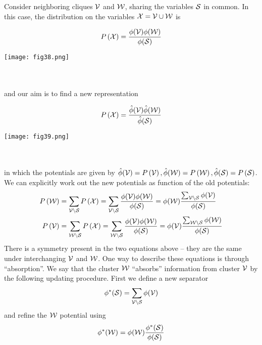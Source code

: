 Consider neighboring cliques $\mathcal{V}$ and $\mathcal{W}$, sharing the variables $\mathcal{S}$ in common. In this case, the distribution on the variables $\mathcal{X}=\mathcal{V}\cup\mathcal{W}$ is

\begin{minipage}{0.6\textwidth}
	\begin{align*}
	P\left(\mathcal{X}\right)=\frac{\phi(\mathcal{V})\phi(\mathcal{W})}{\phi(\mathcal{S})}
	\end{align*}
\end{minipage}
\begin{minipage}{0.4\textwidth}
	\centering
	\texttt{[image: fig38.png]}
\end{minipage}
\\ \\
and our aim is to find a new representation

\begin{minipage}{0.6\textwidth}
	\begin{align*}
	P\left(\mathcal{X}\right)=\frac{\hat{\phi}(\mathcal{V})\hat{\phi}(\mathcal{W})}{\hat{\phi}(\mathcal{S})}
	\end{align*}
\end{minipage}
\begin{minipage}{0.4\textwidth}
	\centering
	\texttt{[image: fig39.png]}
\end{minipage}
\\ \\
in which the potentials are given by $\hat{\phi}(\mathcal{V})=P\left(\mathcal{V}\right),\hat{\phi}(\mathcal{W})=P\left(\mathcal{W}\right),\hat{\phi}(\mathcal{S})=P\left(\mathcal{S}\right)$. We can explicitly work out the new potentials as function of the old potentials:
\begin{align*}
	P\left(\mathcal{W}\right)&=\sum_{\mathcal{V}\setminus\mathcal{S}}P\left(\mathcal{X}\right)=\sum_{\mathcal{V}\setminus\mathcal{S}}\frac{\phi(\mathcal{V})\phi(\mathcal{W})}{\phi(\mathcal{S})}=\phi(\mathcal{W})\frac{\sum_{\mathcal{V}\setminus\mathcal{S}}\phi(\mathcal{V})}{\phi(\mathcal{S})} \\
	P\left(\mathcal{V}\right)&=\sum_{\mathcal{W}\setminus\mathcal{S}}P\left(\mathcal{X}\right)=\sum_{\mathcal{W}\setminus\mathcal{S}}\frac{\phi(\mathcal{V})\phi(\mathcal{W})}{\phi(\mathcal{S})}=\phi(\mathcal{V})\frac{\sum_{\mathcal{W}\setminus\mathcal{S}}\phi(\mathcal{W})}{\phi(\mathcal{S})}
\end{align*}
There is a symmetry present in the two equations above -- they are the same under interchanging $\mathcal{V}$ and $\mathcal{W}$. One way to describe these equations is through ``absorption''.  We say that the cluster $\mathcal{W}$ ``absorbs'' information from cluster $\mathcal{V}$ by the following updating procedure. First we define a new separator
\begin{align*}
	\phi^*(\mathcal{S})=\sum_{\mathcal{V}\setminus\mathcal{S}}\phi(\mathcal{V})
\end{align*}
and refine the $\mathcal{W}$ potential using
\begin{align*}
	\phi^*(\mathcal{W})=\phi(\mathcal{W})\frac{\phi^*(\mathcal{S})}{\phi(\mathcal{S})}
\end{align*}
